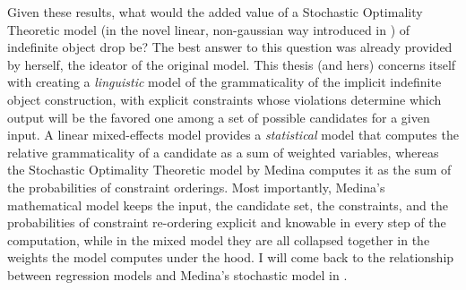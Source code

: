 Given these results, what would the added value of a Stochastic Optimality Theoretic model (in the novel linear, non-gaussian way introduced in ) of indefinite object drop be? The best answer to this question was already provided by \textcite{Medina2007} herself, the ideator of the original model. This thesis (and hers) concerns itself with creating a \textit{linguistic} model of the grammaticality of the implicit indefinite object construction, with explicit constraints whose violations determine which output will be the favored one among a set of possible candidates for a given input. A linear mixed-effects model provides a \textit{statistical} model that computes the relative grammaticality of a candidate as a sum of weighted variables, whereas the Stochastic Optimality Theoretic model by Medina computes it as the sum of the probabilities of constraint orderings. Most importantly, Medina's mathematical model keeps the input, the candidate set, the constraints, and the probabilities of constraint re-ordering explicit and knowable in every step of the computation, while in the mixed model they are all collapsed together in the weights the model computes under the hood. I will come back to the relationship between regression models and Medina's stochastic model in .